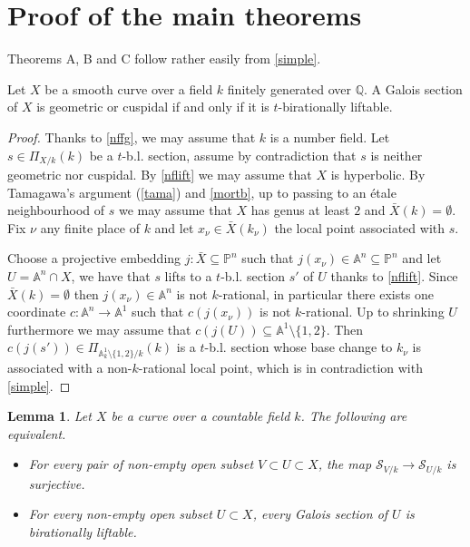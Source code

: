 \documentclass[11pt]{amsart}
\theoremstyle{plain}
\newtheorem{lemma}[theorem]{Lemma}
\theoremstyle{definition}
\newcommand{\1}{\mathbb{1}}
\newcommand{\A}{\mathbb{A}}
\newcommand{\mc}{\mathcal}
\newcommand{\Q}{\mathbb{Q}}
\newcommand{\s}{\subseteq}
\renewcommand{\P}{\mathbb{P}}
\begin{document}
\section{Proof of the main theorems}

Theorems A, B and C follow rather easily from \autoref{simple}.

\begin{TA}
	Let $X$ be a smooth curve over a field $k$ finitely generated over $\Q$. A Galois section of $X$ is geometric or cuspidal if and only if it is $t$-birationally liftable.
	\begin{proof}
		Thanks to \autoref{nffg}, we may assume that $k$ is a number field. Let $s\in\Pi_{X/k}(k)$ be a $t$-b.l. section, assume by contradiction that $s$ is neither geometric nor cuspidal. By \autoref{nflift} we may assume that $X$ is hyperbolic. By Tamagawa's argument (\autoref{tama}) and \autoref{mortb}, up to passing to an étale neighbourhood of $s$ we may assume that $X$ has genus at least $2$ and $\bar{X}(k)=\emptyset$. Fix $\nu$ any finite place of $k$ and let $x_{\nu}\in \bar{X}(k_{\nu})$ the local point associated with $s$.
		
		Choose a projective embedding $j:\bar{X}\s\P^{n}$ such that $j(x_{\nu})\in\A^{n}\s\P^{n}$ and let $U=\A^{n}\cap X$, we have that $s$ lifts to a $t$-b.l. section $s'$ of $U$ thanks to \autoref{nflift}. Since $\bar{X}(k)=\emptyset$ then $j(x_{\nu})\in\A^{n}$ is not $k$-rational, in particular there exists one coordinate $c:\A^{n}\to\A^{1}$ such that $c(j(x_{\nu}))$ is not $k$-rational. Up to shrinking $U$ furthermore we may assume that $c(j(U))\s\A^{1}\setminus\{1,2\}$. Then $c(j(s'))\in\Pi_{\A^{1}_{k}\setminus\{1,2\}/k}(k)$ is a $t$-b.l. section whose base change to $k_{\nu}$ is associated with a non-$k$-rational local point, which is in contradiction with \autoref{simple}.
	\end{proof}
\end{TA}


\begin{lemma}\label{cuspbl}
    Let $X$ be a curve over a countable field $k$. The following are equivalent.
    \begin{itemize}
        \item For every pair of non-empty open subset $V\subset U\subset X$, the map $\mc{S}_{V/k}\to\mc{S}_{U/k}$ is surjective.
        \item For every non-empty open subset $U\subset X$, every Galois section of $U$ is birationally liftable.
    \end{itemize}
\end{lemma}
\end{document}
